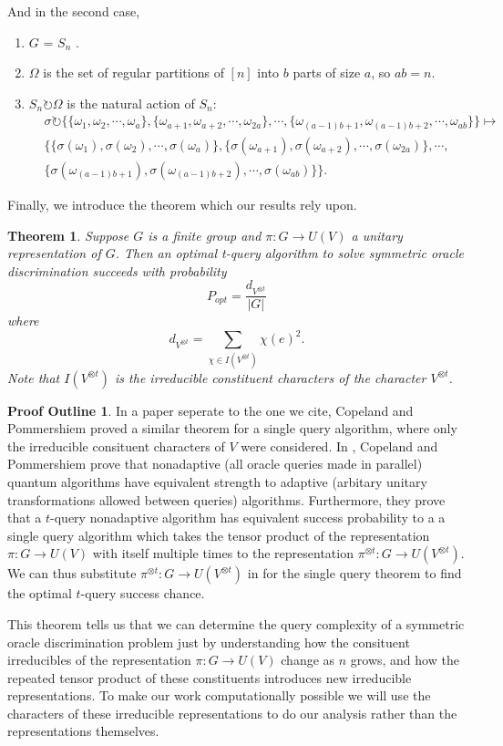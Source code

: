 \documentclass[12pt,twoside]{reedthesis}
\theoremstyle{plain}   %
\newtheorem{thm}{Theorem}[section] %
\theoremstyle{definition}
\newtheorem{outline}{Proof Outline}[section]
\theoremstyle{remark}
\numberwithin{equation}{section}
\def\acts{\circlearrowright} %
\begin{document}
  And in the second case,
  \begin{enumerate}
  \item $G$ = $S_n$ .
  \item $\Omega$ is the set of regular partitions of $[n]$ into $b$ parts of size $a$, so $ab = n$.
  \item $S_n \acts \Omega$ is the natural action of $S_n$:
    \begin{align*}
      &\sigma \acts \{ \{ \omega_1, \omega_2, \cdots, \omega_a \}, \{ \omega_{a+1}, \omega_{a+2}, \cdots, \omega_{2a} \}, \cdots, \{ \omega_{(a-1)b + 1}, \omega_{(a-1)b + 2}, \cdots, \omega_{ab} \}  \} \mapsto &\\
      &\{ \{ \sigma(\omega_1), \sigma(\omega_2), \cdots, \sigma(\omega_a )\}, \{ \sigma(\omega_{a+1}), \sigma(\omega_{a+2}), \cdots, \sigma(\omega_{2a}) \}, \cdots, \\
      & \{ \sigma(\omega_{(a-1)b + 1}), \sigma(\omega_{(a-1)b + 2}), \cdots, \sigma(\omega_{ab}) \} \}.
    \end{align*}
  \end{enumerate}
  Finally, we introduce the theorem which our results rely upon.
  \begin{thm}
    Suppose $G$ is a finite group and $\pi : G \to U (V )$ a unitary representation of $G$. Then
    an optimal t-query algorithm to solve symmetric oracle discrimination succeeds with probability
    \[ P_{opt} = \dfrac{d_{V^{\otimes t}}}{|G|} \]
    where
    \[ d_{V^{\otimes t}} = \sum_{\chi \in I(V^{\otimes t})} \chi (e)^2.\]
    Note that $I(V^{\otimes t})$ is the irreducible constituent characters of the character $V^{\otimes t}$.
  \end{thm}
  \begin{outline}
    In a paper seperate to the one we cite, Copeland and Pommershiem proved a similar theorem for a single query algorithm, where only the irreducible consituent characters of $V$ were considered.
    In \cite{copeland}, Copeland and Pommershiem prove that nonadaptive (all oracle queries made in parallel) quantum algorithms have equivalent strength to adaptive (arbitary unitary transformations allowed between queries)
    algorithms.
    Furthermore, they prove that a $t$-query nonadaptive algorithm has equivalent success probability to a a single query algorithm which takes the tensor product of the representation $\pi:G \to U(V)$ with itself multiple times to the
    representation $\pi^{\otimes t}:G \to U(V^{ \otimes t})$.
    We can thus substitute $\pi^{\otimes t}:G \to U(V^{ \otimes t})$ in for the single query theorem to find the optimal $t$-query success chance.
  \end{outline}
  This theorem tells us that we can determine the query complexity of a symmetric oracle discrimination problem just by understanding how the consituent irreducibles of the representation $\pi : G \to U (V)$ change as $n$ grows,
  and how the repeated tensor product of these constituents introduces new irreducible representations.
  To make our work computationally possible we will use the characters of these irreducible representations to do our analysis rather than the representations themselves.
\end{document}
